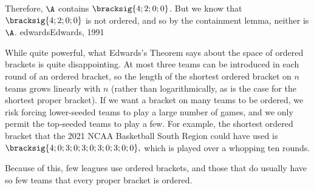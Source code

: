 {{        Therefore, $\A$ contains $\bracksig{4;2;0;0}$. But we know that $\bracksig{4;2;0;0}$ is not ordered, and so by the containment lemma, neither is $\A$.
    }{edwards}{Edwards, 1991}

    While quite powerful, what Edwards's Theorem says about the space of ordered brackets is quite disappointing. At most three teams can be introduced in each round of an ordered bracket, so the length of the shortest ordered bracket on $n$ teams grows linearly with $n$ (rather than logarithmically, as is the case for the shortest proper bracket). If we want a bracket on many teams to be ordered, we risk forcing lower-seeded teams to play a large number of games, and we only permit the top-seeded teams to play a few. For example, the shortest ordered bracket that the 2021 NCAA Basketball South Region could have used is $\bracksig{4; 0; 3; 0; 3; 0; 3; 0; 3; 0; 0},$ which is played over a whopping ten rounds.


    Because of this, few leagues use ordered brackets, and those that do usually have so few teams that every proper bracket is ordered.
}